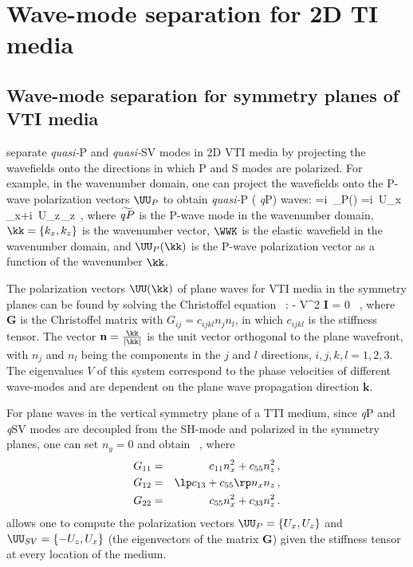 

\section{Wave-mode separation for 2D TI media}
\subsection{Wave-mode separation for symmetry planes of VTI media}
\cite{GEO55-07-09140919} separate {\it quasi-}P 
and {\it quasi-}SV modes in 2D VTI media by projecting the wavefields
onto the directions in which P and S modes are polarized.  For
example, in the wavenumber domain, one can project the wavefields onto
the P-wave polarization vectors $\UU_P$ to obtain {\it quasi-}P ({\it
q}P) waves:
\beq\label{AniDivK}
=i\, \UU_P(\kk) \cdot \WWK 
=i\, U_x\,\WK_x+i\, U_z\,\WK_z\, ,                
\eeq
where $\widetilde{{\it q}P}$ is the P-wave mode in the wavenumber
domain, $\kk=\{k_x,k_z\}$ is the wavenumber vector, $\WWK$ is the
elastic wavefield in the wavenumber domain, and $\UU_P(\kk)$ is the
P-wave polarization vector as a function of the wavenumber $\kk$.


The polarization vectors $\UU(\kk)$ of plane waves for VTI media in
the symmetry planes can be found by solving the Christoffel equation
~\cite[]{akirichards.2002,Tsvankin}:
\beq\label{3dChristoffel} - \rho V^2 {\bf I} \rb \UU = 0 \, ,
\eeq
where {\textbf G} is the Christoffel matrix with
$G_{ij}=c_{ijkl}n_jn_l$, in which $c_{ijkl}$ is the stiffness tensor.
The vector $\mathbf n=\frac{\kk}{\left|\kk\right|}$ is the unit
vector orthogonal to the plane wavefront, with $n_j$ and $n_l$ being
the components in the $j$ and $l$ directions,
$i,j,k,l=1,2,3$. The eigenvalues $V$ of this system correspond to the
phase velocities of different wave-modes and are dependent on the
plane wave propagation direction $\mathbf k$.

For plane waves in the vertical symmetry plane of a TTI medium, since
{\it q}P and {\it q}SV modes are decoupled from the SH-mode and
polarized in the symmetry planes, one can set $n_y=0$ and obtain
\def\c11{c_{11}}
\def\c55{c_{55}}
\def\c13{c_{13}}
\def\c33{c_{33}}
\beq\label{VtiChristoffel}
\lb 
\rb
\lb{}  \, ,
\eeq
where
\begin{eqnarray}
G_{11}&=&c_{11} n_x^2 +c_{55} n_z^2 \, ,\\
G_{12}&=&\lp c_{13}+c_{55}\rp n_xn_z\, ,\\
G_{22}&=&c_{55} n_x^2 +c_{33} n_z^2\, .
\end{eqnarray}
 allows one to compute the polarization vectors
$\UU_P=\{U_x,U_z\}$ and
$\UU_{SV}=\{-U_z,U_x\}$ (the eigenvectors of the matrix
{\textbf G}) given the stiffness tensor at every location of the
medium.

